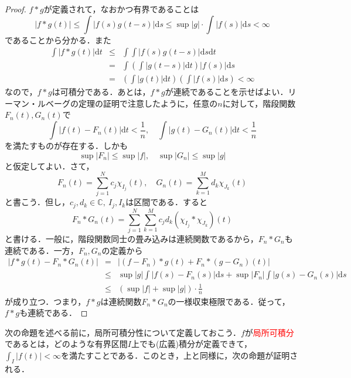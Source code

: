 \documentclass[a4j]{jsbook}
\numberwithin{theorem}{chapter}  %
\begin{document}
\begin{proof}
\(f*g\)が定義されて，なおかつ有界であることは
\begin{equation*}
    |f*g(t)|\leq\int|f(s)g(t-s)|\mathrm{d}s\leq\sup|g|\cdot\int|f(s)|\mathrm{d}s<\infty
\end{equation*}
であることから分かる．また
\begin{eqnarray*}
\int|f*g(t)|\mathrm{d}t&\leq&\int\int|f(s)g(t-s)|\mathrm{d}s\mathrm{d}t \\
&=&\int\left(\int|g(t-s)|\mathrm{d}t\right)|f(s)|\mathrm{d}s \\
&=&\left(\int|g(t)|\mathrm{d}t\right)\left(\int|f(s)|\mathrm{d}s\right)<\infty
\end{eqnarray*}
なので，\(f*g\)は可積分である．あとは，\(f*g\)が連続であることを示せばよい．リーマン・ルベーグの定理の証明で注意したように，任意の\(n\)に対して，階段関数\(F_n(t), G_n(t)\)で
\begin{equation*}
    \int|f(t)-F_n(t)|\mathrm{d}t<\frac{1}{n},\quad\int|g(t)-G_n(t)|\mathrm{d}t<\frac{1}{n}
\end{equation*}
を満たすものが存在する．しかも
\begin{equation*}
    \sup|F_n|\leq\sup|f|,\quad\sup|G_n|\leq\sup|g|
\end{equation*}
と仮定してよい．さて，
\begin{equation*}
    F_n(t)=\sum_{j=1}^N c_j\chi_{I_j}(t),\quad G_n(t)=\sum_{k=1}^M d_k\chi_{J_k}(t)
\end{equation*}
と書こう．但し，\(c_j, d_k\in\mathbb{C},\ I_j, I_k\)は区間である．すると
\begin{equation*}
    F_n*G_n(t)=\sum_{j=1}^N\sum_{k=1}^M c_jd_k(\chi_{I_j}*\chi_{J_k})(t)
\end{equation*}
と書ける．一般に，階段関数同士の畳み込みは連続関数であるから，\(F_n*G_n\)も連続である．一方，\(F_n, G_n\)の定義から
\begin{eqnarray*}
|f*g(t)-F_n*G_n(t)|&=&|(f-F_n)*g(t)+F_n*(g-G_n)(t)| \\
&\leq&\sup|g|\int|f(s)-F_n(s)|\mathrm{d}s+\sup|F_n|\int|g(s)-G_n(s)|\mathrm{d}s \\
&\leq&\left(\sup|f|+\sup|g|\right)\cdot\frac{1}{n}
\end{eqnarray*}
が成り立つ．つまり，\(f*g\)は連続関数\(F_n*G_n\)の一様収束極限である．従って，\(f*g\)も連続である．
\end{proof}
次の命題を述べる前に，局所可積分性について定義しておこう．\(f\)が\textcolor{red}{局所可積分}であるとは，どのような有界区間\(I\)上でも(広義)積分が定義できて，\(\displaystyle\int_I |f(t)|<\infty\)を満たすことである．このとき，上と同様に，次の命題が証明される．
\end{document}
